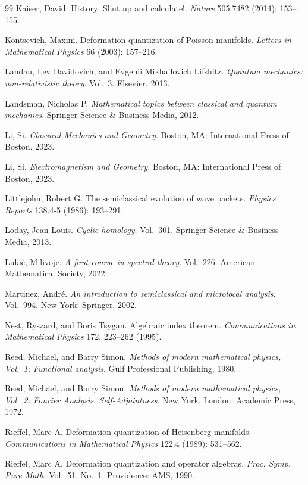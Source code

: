 \begin{thebibliography}{99}
Kaiser, David.
History: Shut up and calculate!.
\emph{Nature} 505.7482 (2014): 153--155.

Kontsevich, Maxim.
Deformation quantization of Poisson manifolds.
\emph{Letters in Mathematical Physics} 66 (2003): 157--216.

Landau, Lev Davidovich, and Evgenii Mikhailovich Lifshitz.
\emph{Quantum mechanics: non-relativistic theory}. Vol.~3. Elsevier, 2013.

Landsman, Nicholas P.
\emph{Mathematical topics between classical and quantum mechanics}.
Springer Science \& Business Media, 2012.

Li, Si.
\emph{Classical Mechanics and Geometry}. Boston, MA: International Press of Boston, 2023.

Li, Si.
\emph{Electromagnetism and Geometry}. Boston, MA: International Press of Boston, 2023.

Littlejohn, Robert G.
The semiclassical evolution of wave packets.
\emph{Physics Reports} 138.4-5 (1986): 193--291.

Loday, Jean-Louis.
\emph{Cyclic homology}. Vol.~301. Springer Science \& Business Media, 2013.

Luki\'c, Milivoje.
\emph{A first course in spectral theory}. Vol.~226.
American Mathematical Society, 2022.

Martinez, Andr\'e.
\emph{An introduction to semiclassical and microlocal analysis}. Vol.~994.
New York: Springer, 2002.

Nest, Ryszard, and Boris Tsygan.
Algebraic index theorem.
\emph{Communications in Mathematical Physics} 172, 223--262 (1995).

Reed, Michael, and Barry Simon.
\emph{Methods of modern mathematical physics, Vol.~1: Functional analysis}.
Gulf Professional Publishing, 1980.

Reed, Michael, and Barry Simon.
\emph{Methods of modern mathematical physics, Vol.~2: Fourier Analysis,
Self-Adjointness}. New York, London: Academic Press, 1972.

Rieffel, Marc A.
Deformation quantization of Heisenberg manifolds.
\emph{Communications in Mathematical Physics} 122.4 (1989): 531--562.

Rieffel, Marc A.
Deformation quantization and operator algebras.
\emph{Proc. Symp. Pure Math.} Vol.~51. No.~1. Providence: AMS, 1990.


\end{thebibliography}
